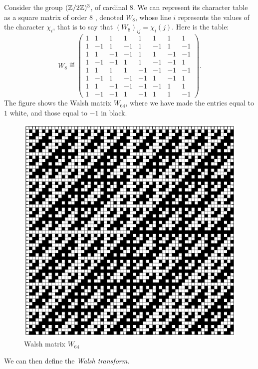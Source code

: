 \begin{exmp}
 \label{notation-32} Consider the group $ (\mathbb{Z}/2 \mathbb{Z})^3 $, of cardinal 8. We can represent its character table as a square matrix of order 8 , denoted $ W_8 $, whose line $ i $ represents the values of the character $ \chi_i $, that is to say that $ (W_8)_{ij} = \chi_i (j) $. Here is the table:
\begin{equation}
\label{eqn-matrix-walsh-8}
W_8 \eqdef \begin{pmatrix} 1 & 1 & 1 & 1 & 1 & 1 & 1 & 1 \\1 & -1 & 1 & -1 & 1 & -1 & 1 & -1 \\1 & 1 & -1 & -1 & 1 & 1 & -1 & -1 \\1 & -1 & -1 & 1 & 1 & -1 & -1 & 1 \\1 & 1 & 1 & 1 & -1 & - 1 & -1 & -1 \\1 & -1 & 1 & -1 & -1 & 1 & -1 & 1 \\1 & 1 & -1 & -1 & -1 & -1 & 1 & 1 \\1 & -1 & -1 & 1 & -1 & 1 & 1 & -1 \end{pmatrix}.
\end{equation}
The figure  shows the Walsh matrix $ W_{64} $, where we have made the entries equal to $ 1 $ white, and those equal to $ -1 $ in black. \begin{figure}[ht] 
    \begin{center}
    \includegraphics [scale = 0.4]{images/matrices-walsh.eps}
    \end{center}
    \caption{Walsh matrix $ W_{64} $}
              \label{fig-matrices-walsh}
\end{figure}
\end{exmp}
We can then define the \textit{Walsh transform}.
 
